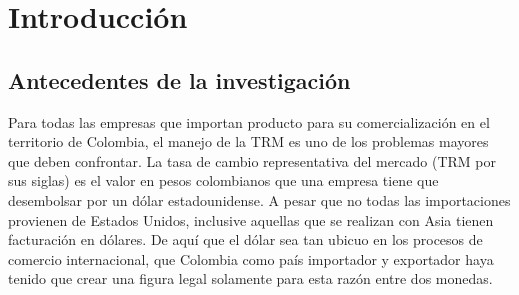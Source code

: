 

\chapter{Introducción}

\ifpdf
    \graphicspath{{1_introduction/figures/PNG/}{1_introduction/figures/PDF/}{1_introduction/figures/}}
\else
    \graphicspath{{1_introduction/figures/EPS/}{1_introduction/figures/}}
\fi


\section{Antecedentes de la investigación}

Para todas las empresas que importan producto para su comercialización en el territorio de Colombia, el manejo de la TRM es uno de los problemas mayores que deben confrontar. La tasa de cambio representativa del mercado (TRM por sus siglas) es el valor en pesos colombianos que una empresa tiene que desembolsar por un dólar estadounidense. A pesar que no todas las importaciones provienen de Estados Unidos, inclusive aquellas que se realizan con Asia tienen facturación en dólares. De aquí que el dólar sea tan ubicuo en los procesos de comercio internacional, que Colombia como país importador y exportador haya tenido que crear una figura legal solamente para esta razón entre dos monedas. 

